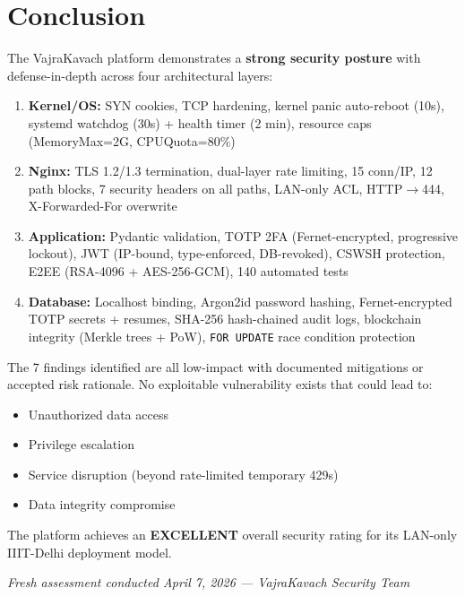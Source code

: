 \documentclass[11pt,a4paper]{article}
\begin{document}
\section{Conclusion}

The VajraKavach platform demonstrates a \textbf{strong security posture} with defense-in-depth across four architectural layers:

\begin{enumerate}[nosep]
  \item \textbf{Kernel/OS:} SYN cookies, TCP hardening, kernel panic auto-reboot (10s), systemd watchdog (30s) + health timer (2 min), resource caps (MemoryMax=2G, CPUQuota=80\%)
  \item \textbf{Nginx:} TLS 1.2/1.3 termination, dual-layer rate limiting, 15 conn/IP, 12 path blocks, 7 security headers on all paths, LAN-only ACL, HTTP$\rightarrow$444, X-Forwarded-For overwrite
  \item \textbf{Application:} Pydantic validation, TOTP 2FA (Fernet-encrypted, progressive lockout), JWT (IP-bound, type-enforced, DB-revoked), CSWSH protection, E2EE (RSA-4096 + AES-256-GCM), 140 automated tests
  \item \textbf{Database:} Localhost binding, Argon2id password hashing, Fernet-encrypted TOTP secrets + resumes, SHA-256 hash-chained audit logs, blockchain integrity (Merkle trees + PoW), \texttt{FOR UPDATE} race condition protection
\end{enumerate}

\vspace{0.5cm}

The 7 findings identified are all low-impact with documented mitigations or accepted risk rationale. No exploitable vulnerability exists that could lead to:
\begin{itemize}[nosep]
  \item Unauthorized data access
  \item Privilege escalation
  \item Service disruption (beyond rate-limited temporary 429s)
  \item Data integrity compromise
\end{itemize}

The platform achieves an \textbf{EXCELLENT} overall security rating for its LAN-only IIIT-Delhi deployment model.

\vspace{1cm}
\begin{center}
\textit{Fresh assessment conducted April 7, 2026 --- VajraKavach Security Team}
\end{center}
\end{document}
